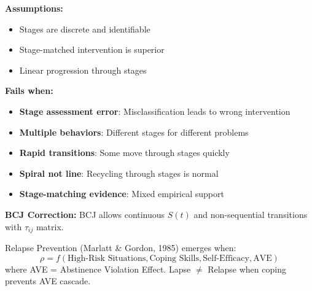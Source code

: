 \begin{tcolorbox}[colback=red!5!white, colframe=red!75!black, title=Boundary Condition: Where Therapeutic Staging Fails]
\textbf{Assumptions:}
\begin{itemize}[nosep]
\item Stages are discrete and identifiable
\item Stage-matched intervention is superior
\item Linear progression through stages
\end{itemize}

\textbf{Fails when:}
\begin{itemize}[nosep]
\item \textbf{Stage assessment error}: Misclassification leads to wrong intervention
\item \textbf{Multiple behaviors}: Different stages for different problems
\item \textbf{Rapid transitions}: Some move through stages quickly
\item \textbf{Spiral not line}: Recycling through stages is normal
\item \textbf{Stage-matching evidence}: Mixed empirical support
\end{itemize}

\textbf{BCJ Correction:} BCJ allows continuous $S(t)$ and non-sequential transitions with $\tau_{ij}$ matrix.
\end{tcolorbox}


\begin{theorem}
\label{thm:relapse-prevention}
Relapse Prevention (Marlatt \& Gordon, 1985) emerges when:
\begin{equation}
\boxed{\rho = f(\text{High-Risk Situations}, \text{Coping Skills}, \text{Self-Efficacy}, \text{AVE})}
\end{equation}
where AVE = Abstinence Violation Effect. Lapse $\neq$ Relapse when coping prevents AVE cascade.
\end{theorem}


